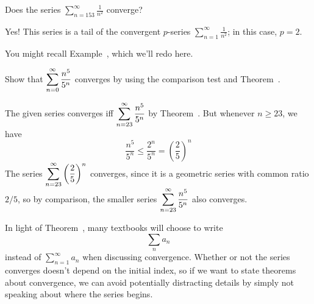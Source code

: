 \begin{example}
Does the series $\displaystyle\sum_{n=153}^\infty \frac{1}{n^2}$ converge?
\end{example}
\begin{solution}
  Yes! This series is a tail of the convergent $p$-series $\displaystyle\sum_{n=1}^\infty \frac{1}{n^2}$; in this case, $p = 2$.
\end{solution}

You might recall Example~, which we'll redo here.
\begin{example}
  Show that $\displaystyle\sum_{n=0}^\infty {n^5\over 5^n}$ converges by using the comparison test and Theorem~.
\end{example}

\begin{solution}
  The given series converges iff $\displaystyle\sum_{n=23}^\infty {n^5\over 5^n}$ by Theorem~.  But whenever $n \geq 23$, we have
  $$
  \frac{n^5}{5^n} \leq \frac{2^n}{5^n} = \left( \frac{2}{5} \right)^n
  $$
  The series $\displaystyle\sum_{n=23}^\infty \left( \frac{2}{5} \right)^n$
  converges, since it is a geometric series with common ratio $2/5$,
  so by comparison, the smaller series $\displaystyle\sum_{n=23}^\infty
  {n^5\over 5^n}$ also converges.
\end{solution}

In light of Theorem~, many textbooks
will choose to write
\[
\sum_n a_n
\]
instead of $\displaystyle\sum_{n=1}^\infty a_n$ when discussing
convergence.  Whether or not the series converges doesn't depend on
the initial index, so if we want to state theorems about convergence,
we can avoid potentially distracting details by simply not speaking
about where the series begins.
